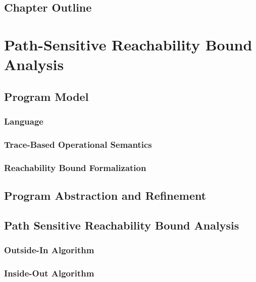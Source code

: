 \documentclass[12pt, letterpaper]{report}   %
\begin{document}
\section{Chapter Outline}
\label{sec:reachability-outline}

\chapter{Path-Sensitive Reachability Bound Analysis}
\label{sec:reachability-analysis}

\section{{Program Model}}
\label{sec:language}
\subsection{Language}
\subsection{Trace-Based Operational Semantics}
% 
\subsection{{Reachability Bound Formalization}}
\label{sec:execution_rb}
\section{Program Abstraction and Refinement}
\label{sec:reachability-program_refine}

\section{Path Sensitive Reachability Bound Analysis}
\label{sec:reachability-analysis}
\subsection{Outside-In Algorithm}
\label{sec:outsidein}
\subsection{Inside-Out Algorithm}
\label{sec:insideout}
\end{document}
